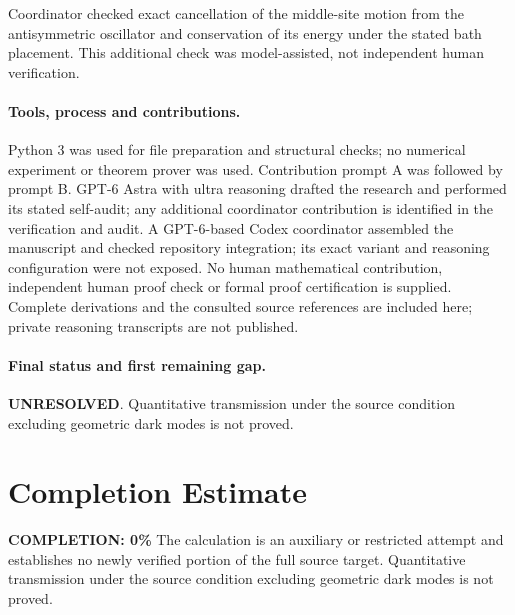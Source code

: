 \documentclass[11pt]{article}
\begin{document}
Coordinator checked exact cancellation of the middle-site motion from the antisymmetric oscillator and conservation of its energy under the stated bath placement. This additional check was model-assisted, not independent human verification.

\paragraph{Tools, process and contributions.}
Python 3 was used for file preparation and structural checks; no numerical experiment or theorem prover was used. Contribution prompt A was followed by prompt B. GPT-6 Astra with ultra reasoning drafted the research and performed its stated self-audit; any additional coordinator contribution is identified in the verification and audit. A GPT-6-based Codex coordinator assembled the manuscript and checked repository integration; its exact variant and reasoning configuration were not exposed. No human mathematical contribution, independent human proof check or formal proof certification is supplied. Complete derivations and the consulted source references are included here; private reasoning transcripts are not published.

\paragraph{Final status and first remaining gap.}
\textbf{UNRESOLVED}. Quantitative transmission under the source condition excluding geometric dark modes is not proved.

\section{Completion Estimate}
\noindent\textbf{COMPLETION: 0\%}
The calculation is an auxiliary or restricted attempt and establishes no newly verified portion of the full source target. Quantitative transmission under the source condition excluding geometric dark modes is not proved.
\end{document}
